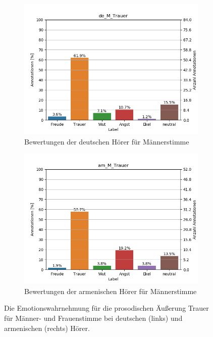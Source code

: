 \documentclass[11pt,a4paper,headsepline,twoside,toc=bibliography]{scrreprt}
\begin{document}
\begin{figure}[t!]
	\medskip
	\begin{subfigure}{0.48\textwidth}
		\includegraphics[width=\linewidth]{plots/de_M_Trauer.png}
		\caption{Bewertungen der deutschen Hörer für Männerstimme} \label{fig:de_m_T}
	\end{subfigure}\hspace*{\fill}
	\begin{subfigure}{0.48\textwidth}
		\includegraphics[width=\linewidth]{plots/am_M_Trauer.png}
		\caption{Bewertungen der armenischen Hörer für Männerstimme} \label{fig:am_m_T}
	\end{subfigure}
	
	\caption{Die Emotionswahrnehmung für die prosodischen Äußerung Trauer für Männer- und Frauenstimme bei deutschen (links) und armenischen (rechts) Hörer.} \label{fig:speaker_tone_T}
\end{figure}
\end{document}
